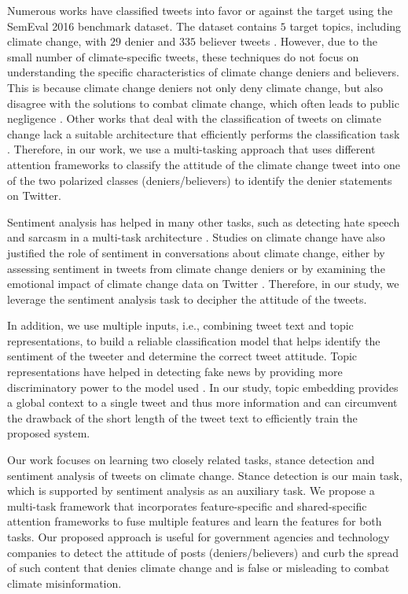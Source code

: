 \documentclass[letterpaper]{article}
\begin{document}
\par \noindent Numerous works have classified tweets into favor or against the target using the SemEval 2016 benchmark dataset. The dataset contains $5$ target topics, including climate change, with $29$ denier and $335$ believer tweets \cite{li2019multi,wang2020neural}. However, due to the small number of climate-specific tweets, these techniques do not focus on understanding the specific characteristics of climate change deniers and believers. This is because climate change deniers not only deny climate change, but also disagree with the solutions to combat climate change, which often leads to public negligence \cite{zhou2021confirmation}. Other works that deal with the classification of tweets on climate change lack a suitable architecture that efficiently performs the classification task \cite{kabaghe66classifying}. Therefore, in our work, we use a multi-tasking approach that uses different attention frameworks to classify the attitude of the climate change tweet into one of the two polarized classes (deniers/believers) to identify the denier statements on Twitter.
\par \noindent Sentiment analysis has helped in many other tasks, such as detecting hate speech and sarcasm in a multi-task architecture \cite{majumder2019sentiment}. Studies on climate change have also justified the role of sentiment in conversations about climate change, either by assessing sentiment in tweets from climate change deniers or by examining the emotional impact of climate change data on Twitter \cite{dahal2019topic,el2021novel}. Therefore, in our study, we leverage the sentiment analysis task to decipher the attitude of the tweets.
\par \noindent In addition, we use multiple inputs, i.e., combining tweet text and topic representations, to build a reliable classification model that helps identify the sentiment of the tweeter and determine the correct tweet attitude. Topic representations have helped in detecting fake news by providing more discriminatory power to the model used \cite{DBLP:conf/aaai/GautamVM21}. In our study, topic embedding provides a global context to a single tweet and thus more information and can circumvent the drawback of the short length of the tweet text to efficiently train the proposed system.
\par\noindent Our work focuses on learning two closely related tasks, stance detection and sentiment analysis of tweets on climate change. Stance detection is our main task, which is supported by sentiment analysis as an auxiliary task. We propose a multi-task framework that incorporates feature-specific and shared-specific attention frameworks to fuse multiple features and learn the features for both tasks. Our proposed approach is useful for government agencies and technology companies to detect the attitude of posts (deniers/believers) and curb the spread of such content that denies climate change and is false or misleading to combat climate misinformation.
\end{document}
